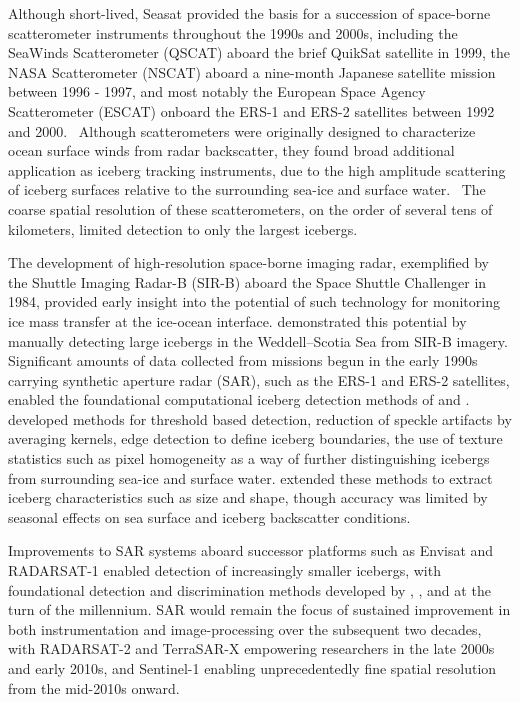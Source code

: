 \documentclass[11pt, letterpaper]{article}
\begin{document}
Although short-lived, Seasat provided the basis for a succession of space-borne 
scatterometer instruments throughout the 1990s and 2000s, including the SeaWinds Scatterometer (QSCAT) aboard the brief QuikSat satellite in 1999, the NASA Scatterometer (NSCAT) aboard a nine-month Japanese satellite mission between 1996 - 1997, and most notably the European Space Agency Scatterometer (ESCAT) onboard the ERS-1 and ERS-2 satellites between 1992 and 2000.~\parencite{long_icebergs_2002} Although scatterometers were originally designed to characterize ocean surface winds 
from radar backscatter, they found broad additional application as iceberg tracking 
instruments, due to the high amplitude scattering of iceberg surfaces relative to the surrounding sea-ice and surface water.~\parencite{long_icebergs_2002} The coarse spatial resolution of these scatterometers, on the order of several tens of kilometers, limited detection to only the largest icebergs.~\parencite{long_icebergs_2002} 

The development of high-resolution space-borne imaging radar, exemplified by the 
Shuttle Imaging Radar-B (SIR-B) aboard the Space Shuttle Challenger in 1984, 
provided early insight into the potential of such technology for monitoring 
ice mass transfer at the ice-ocean interface. \textcite{carsey_etal_1986} 
demonstrated this potential by manually detecting large icebergs in the 
Weddell--Scotia Sea from SIR-B imagery. Significant amounts of data collected from missions begun in the early 1990s carrying synthetic aperture radar (SAR), such as the ERS-1 and ERS-2 satellites, enabled the foundational computational iceberg detection methods of \textcite{willis_etal_1996} and \textcite{young_etal_1998}. \textcite{willis_etal_1996} developed methods for threshold based detection, reduction of speckle artifacts by averaging kernels, edge detection to define iceberg boundaries, the use of texture statistics such as pixel homogeneity as a way of further distinguishing icebergs from surrounding sea-ice and surface water. \textcite{young_etal_1998} extended these methods to extract iceberg 
characteristics such as size and shape, though accuracy was limited by 
seasonal effects on sea surface and iceberg backscatter conditions. 

Improvements to SAR systems aboard successor platforms such as Envisat and 
RADARSAT-1 enabled detection of increasingly smaller icebergs, with foundational 
detection and discrimination methods developed by \textcite{power_etal_2001}, 
\textcite{gill_2001}, and \textcite{gladstone_bigg_2002} at the turn of the 
millennium. SAR would remain the focus of sustained improvement in both 
instrumentation and image-processing over the subsequent two decades, with 
RADARSAT-2 and TerraSAR-X empowering researchers in the late 2000s and early 
2010s, and Sentinel-1 enabling unprecedentedly fine spatial resolution from the 
mid-2010s onward. 
\end{document}
